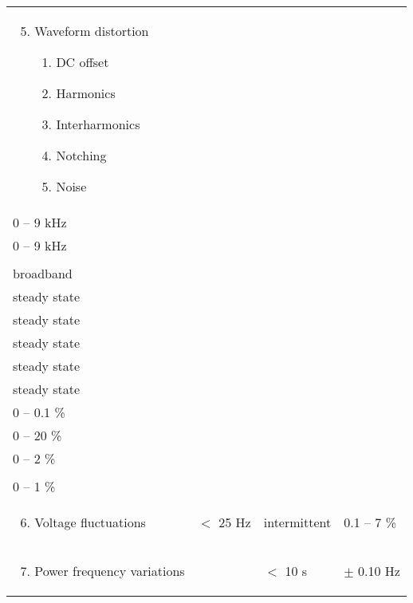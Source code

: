 \begin{center}
\begin{longtable}{m{6cm} m{2.5cm} m{3cm} m{3cm}}
\begin{enumerate}[itemsep=0pt,topsep=0pt]
\setcounter{enumi}{4} 
\item Waveform distortion
      \begin{enumerate}[itemsep=0pt,topsep=0pt]
         \item DC offset
         \item Harmonics
         \item Interharmonics
         \item Notching
         \item Noise
      \end{enumerate}
\end{enumerate}
 & \makecell{\vspace{1cm}\\0 -- 9 kHz \vspace{0.1cm}\\ 0 -- 9 kHz \\\vspace{0.2cm}\\ broadband}  & \makecell{\vspace{0.2cm}\\steady state \vspace{0.1cm}\\ steady state \vspace{0.1cm}\\ steady state \vspace{0.1cm}\\ steady state \vspace{0.1cm}\\ steady state} & \makecell{\vspace{0.2cm}\\ 0 -- 0.1 \% \vspace{0.1cm}\\ 0 -- 20 \% \vspace{0.1cm}\\ 0 -- 2 \% \\\vspace{0.2cm}\\ 0 -- 1 \%}  \\\hline
 
\begin{enumerate}[itemsep=0pt,topsep=0pt]
\setcounter{enumi}{5} 
\item  Voltage fluctuations
\end{enumerate}
 & $<$ 25 Hz & intermittent &0.1 -- 7 \%\\\hline

\begin{enumerate}[itemsep=0pt,topsep=0pt]
\setcounter{enumi}{6} 
\item  Power frequency variations
\end{enumerate}
&  & $<$ 10 s & $\pm$ 0.10 Hz\\\hline
\end{longtable}
\end{center}

